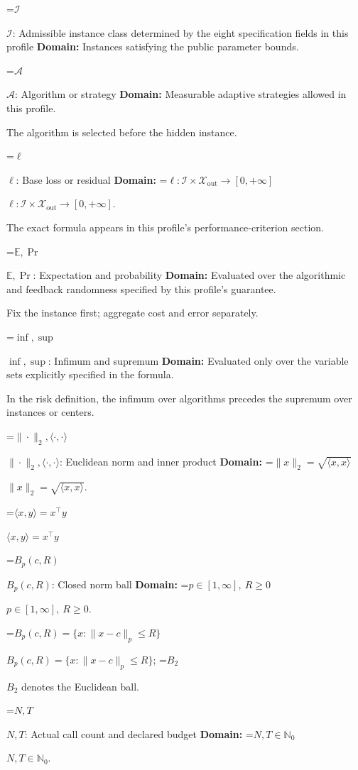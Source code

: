 \documentclass[10pt,a4paper]{article}
\newcommand{\AtlasMath}[1]{\par\begingroup\centering\setbox0=\hbox{$\displaystyle #1$}\ifdim\wd0>1.4\linewidth\typeout{ATLAS WIDE FORMULA: \the\wd0}\fi\ifdim\wd0>\linewidth\resizebox{\linewidth}{!}{\box0}\else\box0\fi\par\endgroup}
\newcommand{\AtlasInlineMath}[1]{\begingroup\setbox0=\hbox{$#1$}\ifdim\wd0>.4\linewidth\endgroup\AtlasMath{#1}\else\endgroup$#1$\fi}
\begin{document}
\AtlasInlineMath{\mathcal{I}}: Admissible instance class determined by the eight specification fields in this profile \textbf{Domain:} Instances satisfying the public parameter bounds.



\AtlasInlineMath{\mathcal{A}}: Algorithm or strategy \textbf{Domain:} Measurable adaptive strategies allowed in this profile.



The algorithm is selected before the hidden instance.



\AtlasInlineMath{\ell}: Base loss or residual \textbf{Domain:} \AtlasInlineMath{\ell:\mathcal{I}\times\mathcal{X}_{\mathrm{out}}\to[0,+\infty]}.



The exact formula appears in this profile's performance-criterion section.



\AtlasInlineMath{\mathbb{E},\Pr}: Expectation and probability \textbf{Domain:} Evaluated over the algorithmic and feedback randomness specified by this profile's guarantee.



Fix the instance first; aggregate cost and error separately.



\AtlasInlineMath{\inf,\sup}: Infimum and supremum \textbf{Domain:} Evaluated only over the variable sets explicitly specified in the formula.



In the risk definition, the infimum over algorithms precedes the supremum over instances or centers.



\AtlasInlineMath{\|\cdot\|_2,\langle\cdot,\cdot\rangle}: Euclidean norm and inner product \textbf{Domain:} \AtlasInlineMath{\|x\|_2=\sqrt{\langle x,x\rangle}}.



\AtlasInlineMath{\langle x,y\rangle=x^\top y}



\AtlasInlineMath{B_p(c,R)}: Closed norm ball \textbf{Domain:} \AtlasInlineMath{p\in[1,\infty],\ R\ge0}.



\AtlasInlineMath{B_p(c,R)=\{x:\|x-c\|_p\le R\}}; \AtlasInlineMath{B_2} denotes the Euclidean ball.



\AtlasInlineMath{N,T}: Actual call count and declared budget \textbf{Domain:} \AtlasInlineMath{N,T\in\mathbb{N}_0}.
\end{document}
